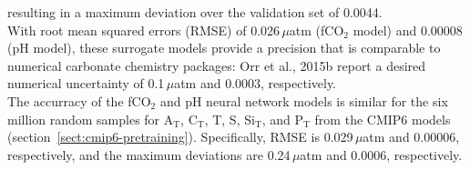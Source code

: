 \documentclass{article}
\begin{document}
	resulting in a maximum deviation over the validation set of 0.0044. \\
	With root mean squared errors (RMSE) of 0.026\,$\mu$atm (fCO$_2$ model) and 0.00008 (pH model), these surrogate models provide a precision that is comparable to numerical carbonate chemistry packages: Orr et al., 2015b report a desired numerical uncertainty of 0.1\,$\mu$atm and 0.0003, respectively. \\
	The accurracy of the fCO$_2$ and pH neural network models is similar for the six million random samples for A$_\text{T}$, C$_\text{T}$, T, S, Si$_\text{T}$, and P$_\text{T}$ from the CMIP6 models (section~\ref{sect:cmip6-pretraining}). Specifically, RMSE is 0.029\,$\mu$atm and 0.00006, respectively, and the maximum deviations are 0.24\,$\mu$atm and 0.0006, respectively.     
	
\end{document}
